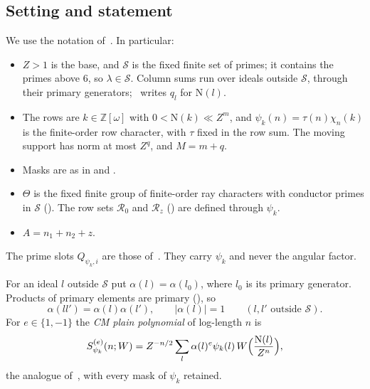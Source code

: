 \documentclass[11pt]{article}
\numberwithin{equation}{section}
\newcommand{\OO}{\mathbb Z[\omega]}
\newcommand{\N}{\mathrm N}
\begin{document}
\subsection{Setting and statement}\label{sec:s5-setting}
We use the notation of~\cite[\S\S 18 and 13]{OAI78}. In particular:
\begin{itemize}
\item $Z>1$ is the base, and $\mathcal S$ is the fixed finite set of primes; it contains the primes above $6$,
 so $\lambda\in\mathcal S$. Column sums run over ideals outside $\mathcal S$, through their primary
 generators;~\cite{OAI78} writes $q_l$ for $\N(l)$.
\item The rows are $k\in\OO$ with $0<\N(k)\ll Z^m$, and $\psi_k(n)=\tau(n)\chi_n(k)$ is the finite-order row
 character, with $\tau$ fixed in the row sum. The moving support has norm at most $Z^q$, and $M=m+q$.
\item Masks are as in \cite[Section~18]{OAI78} and \cite[Section~13.1]{OAI78}.
\item $\Theta$ is the fixed finite group of finite-order ray characters with conductor primes in $\mathcal S$
 (\cite[Section~18]{OAI78}). The row sets $\mathcal R_0$ and $\mathcal R_z$ (\cite[Section~18]{OAI78}) are defined through
 $\psi_k$.
\item $A=n_1+n_2+z$.
\end{itemize}
The prime slots $Q_{\psi_k,i}$ are those of~\cite[eq.~(13.1)]{OAI78}. They carry
$\psi_k$ and never the angular factor.

For an ideal $l$ outside $\mathcal S$ put $\alpha(l)=\alpha(l_0)$, where $l_0$ is its primary
generator. Products of primary elements are primary (\cite[Section~4.1]{OAI78}), so
\begin{equation}\label{eq:s5-alpha-mult}
 \alpha(ll')=\alpha(l)\alpha(l'),\qquad|\alpha(l)|=1\qquad(l,l'\text{ outside }\mathcal S).
\end{equation}
For $e\in\{1,-1\}$ the \emph{CM plain polynomial} of log-length $n$ is
\begin{equation}\label{eq:s5-plain-def}
 S^{(e)}_{\psi_k}(n;W)=Z^{-n/2}\sum_l\alpha(l)^e\psi_k(l)\,W\Bigl(\frac{\N(l)}{Z^n}\Bigr),
\end{equation}
the analogue of~\cite[eq.~(4.1)]{OAI78}, with every mask of $\psi_k$ retained.
\end{document}

